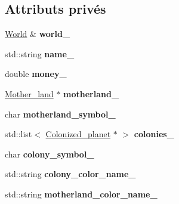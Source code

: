 \subsection*{Attributs privés}
\begin{DoxyCompactItemize}
\item 
\hypertarget{classFaction_a6d79b916267324627cddbfc04a4c9a64}{\hyperlink{classWorld}{World} \& {\bfseries world\-\_\-}}\label{classFaction_a6d79b916267324627cddbfc04a4c9a64}

\item 
\hypertarget{classFaction_a632028ec500010c59419327a4cce3532}{std\-::string {\bfseries name\-\_\-}}\label{classFaction_a632028ec500010c59419327a4cce3532}

\item 
\hypertarget{classFaction_a7414f60b810c31e115e8f6995d47aa6e}{double {\bfseries money\-\_\-}}\label{classFaction_a7414f60b810c31e115e8f6995d47aa6e}

\item 
\hypertarget{classFaction_af9ece6405c2dc01b16a18be59ff2893e}{\hyperlink{classMother__land}{Mother\-\_\-land} $\ast$ {\bfseries motherland\-\_\-}}\label{classFaction_af9ece6405c2dc01b16a18be59ff2893e}

\item 
\hypertarget{classFaction_aee4de39f54f688641def6c0af48dfb29}{char {\bfseries motherland\-\_\-symbol\-\_\-}}\label{classFaction_aee4de39f54f688641def6c0af48dfb29}

\item 
\hypertarget{classFaction_af79e92739f25528585a539cefd719169}{std\-::list$<$ \hyperlink{classColonized__planet}{Colonized\-\_\-planet} $\ast$ $>$ {\bfseries colonies\-\_\-}}\label{classFaction_af79e92739f25528585a539cefd719169}

\item 
\hypertarget{classFaction_a3c87e113f23c7638ec3ae447076f9f4a}{char {\bfseries colony\-\_\-symbol\-\_\-}}\label{classFaction_a3c87e113f23c7638ec3ae447076f9f4a}

\item 
\hypertarget{classFaction_aff4c256d6a30079ab09d5a9507003440}{std\-::string {\bfseries colony\-\_\-color\-\_\-name\-\_\-}}\label{classFaction_aff4c256d6a30079ab09d5a9507003440}

\item 
\hypertarget{classFaction_ac67cd3b073d08e8dc3ac91a52a9daac0}{std\-::string {\bfseries motherland\-\_\-color\-\_\-name\-\_\-}}\label{classFaction_ac67cd3b073d08e8dc3ac91a52a9daac0}


\end{DoxyCompactItemize}
